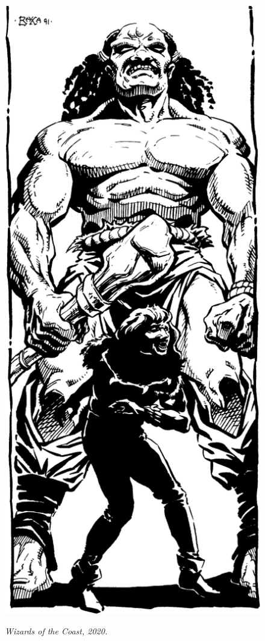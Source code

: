 \begin{figure}[t!]
\centering
\includegraphics[width=\columnwidth]{images/halfgiant-1.png}
\par\textit{\small\textcopyright Wizards of the Coast, 2020.}
\end{figure}

